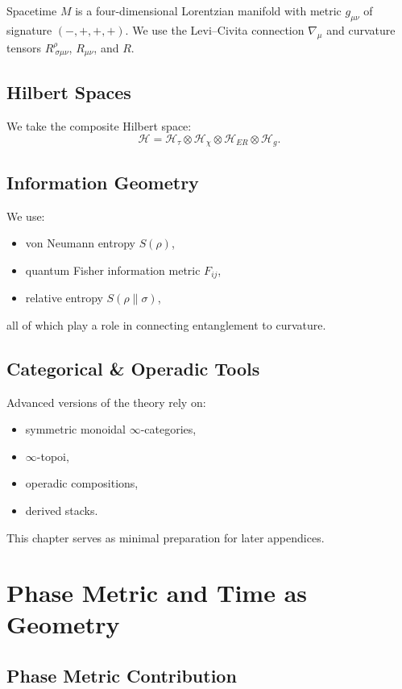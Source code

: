 Spacetime $M$ is a four-dimensional Lorentzian manifold with metric $g_{\mu\nu}$ of signature $(-,+,+,+)$. 
We use the Levi--Civita connection $\nabla_\mu$ and curvature tensors $R^\rho_{~\sigma\mu\nu}$, $R_{\mu\nu}$, and $R$.

\section{Hilbert Spaces}

We take the composite Hilbert space:
\[
\mathcal{H} = \mathcal{H}_\tau \otimes \mathcal{H}_\chi \otimes \mathcal{H}_{ER} \otimes \mathcal{H}_g.
\]

\section{Information Geometry}

We use:

\begin{itemize}
  \item von Neumann entropy $S(\rho)$,
  \item quantum Fisher information metric $F_{ij}$,
  \item relative entropy $S(\rho\|\sigma)$,
\end{itemize}

all of which play a role in connecting entanglement to curvature.

\section{Categorical \& Operadic Tools}

Advanced versions of the theory rely on:

\begin{itemize}
  \item symmetric monoidal $\infty$-categories,
  \item $\infty$-topoi,
  \item operadic compositions,
  \item derived stacks.
\end{itemize}

This chapter serves as minimal preparation for later appendices.

\chapter{Phase Metric and Time as Geometry}

\section{Phase Metric Contribution}

